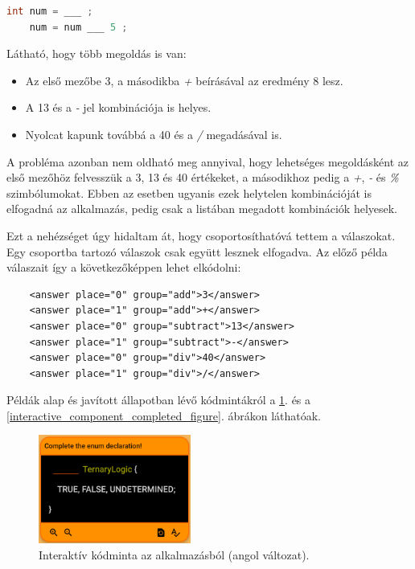 \documentclass[12pt,a4paper]{article}
\begin{document}
	\bigskip
	\begin{lstlisting}[language=Java]
	int num = ___ ;
	num = num ___ 5 ;
	\end{lstlisting}  
	\bigskip
	
	Látható, hogy több megoldás is van:
	
	\begin{itemize}
		\item Az első mezőbe 3, a másodikba \textit{+} beírásával az eredmény 8 lesz.
		\item A 13 és a \textit{-} jel kombinációja is helyes.
		\item Nyolcat kapunk továbbá a 40 és a \textit{/} megadásával is.
	\end{itemize}
	
	A probléma azonban nem oldható meg annyival, hogy lehetséges megoldásként az első mezőhöz felvesszük a 3, 13 és 40 értékeket, a másodikhoz pedig a \textit{+}, \textit{-} és \textit{\%} szimbólumokat. Ebben az esetben ugyanis ezek helytelen kombinációját is elfogadná az alkalmazás, pedig csak a listában megadott kombinációk helyesek.
	
	Ezt a nehézséget úgy hidaltam át, hogy csoportosíthatóvá tettem a válaszokat. Egy csoportba tartozó válaszok csak együtt lesznek elfogadva. Az előző példa válaszait így a következőképpen lehet elkódolni:
	
	\bigskip
	\begin{lstlisting}
	<answer place="0" group="add">3</answer>
	<answer place="1" group="add">+</answer>
	<answer place="0" group="subtract">13</answer>
	<answer place="1" group="subtract">-</answer>
	<answer place="0" group="div">40</answer>
	<answer place="1" group="div">/</answer>
	\end{lstlisting}
	\bigskip
	
	Példák alap és javított állapotban lévő kódmintákról a \ref{interactive_component_figure}. és a \ref{interactive_component_completed_figure}. ábrákon láthatóak. 
	
	\begin{figure}
		\centering
		\includegraphics[width=5cm]{interactive_not_completed}
		\caption{Interaktív kódminta az alkalmazásból (angol változat).}
		\label{interactive_component_figure}
	\end{figure}
	
\end{document}
